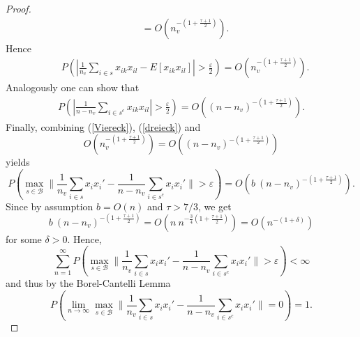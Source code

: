 \documentclass[Research_Module_ES.tex]{subfiles}
\begin{document}
\begin{proof}
\begin{align*}
&=O\left(  n_v^{-\left( 1+\frac{\tau+1}{2}  \right)} \right).
\end{align*}
Hence
\begin{align*}
&P\left(\left| \frac{1}{n_v}\sum_{i\in s}x_{ik}x_{il}-E[x_{ik} x_{il}] \right|>\frac{\varepsilon}{2}\right)=O\left(n_v^{-\left(1+\frac{\tau+1}{2}\right)}\right).
\end{align*}
Analogously one can show that
\begin{align*}
P\left(\left| \frac{1}{n-n_v}\sum_{i\in s^c}x_{ik}x_{il}\right|>\frac{\varepsilon}{2}\right)=O\left((n-n_v)^{-\left(1+\frac{\tau+1}{2}\right)}\right).
\end{align*}
Finally, combining (\ref{Viereck}), (\ref{dreieck}) and 
\[
	O\left(n_v^{-\left(1+\frac{\tau+1}{2}\right)}\right)=O\left((n-n_v)^{-\left(1+\frac{\tau+1}{2}\right)}\right)
\]
yields 
\[
	P\left( \max_{s\in \mathcal{B}}\biggl\lVert \frac{1}{n_v}\sum_{i\in s}x_ix_i' - \frac{1}{n-n_v}\sum_{i\in s^c}x_ix_i'\biggr\rVert>\varepsilon\right)=O\left(b~(n-n_v)^{-\left(1+\frac{\tau+1}{2}\right)}\right).
\]
Since by assumption $b=O(n)$ and $\tau>7/3$, we get 
\[
	b~(n-n_v)^{-\left(1+\frac{\tau+1}{2}\right)}=O\left(n~n^{-\frac{3}{4}\left(1+\frac{\tau+1}{2}\right)}\right)=O\left(n^{-(1+\delta)}\right)
\]
for some $\delta>0$. Hence,
\[
	\sum_{n=1}^{\infty}P\left( \max_{s\in \mathcal{B}}\biggl\lVert \frac{1}{n_v}\sum_{i\in s}x_ix_i' - \frac{1}{n-n_v}\sum_{i\in s^c}x_ix_i'\biggr\rVert>\varepsilon\right)<\infty
\]
and thus by the Borel-Cantelli Lemma
\[
	P\left(\lim_{n\to\infty} \max_{s\in \mathcal{B}}\biggl\lVert \frac{1}{n_v}\sum_{i\in s}x_ix_i' - \frac{1}{n-n_v}\sum_{i\in s^c}x_ix_i'\biggr\rVert =0\right)=1.
\]
\end{proof}
\end{document}
